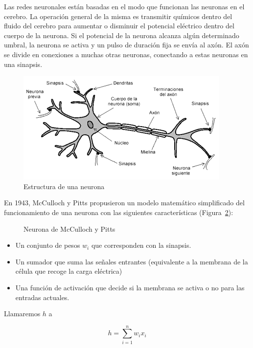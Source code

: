 Las redes neuronales están basadas en el modo que funcionan las neuronas en el cerebro. La operación general de la misma es transmitir químicos dentro del fluido del cerebro para aumentar o disminuir el potencial eléctrico dentro del cuerpo de la neurona. Si el potencial de la neurona alcanza algún determinado umbral, la neurona se activa y un pulso de duración fija se envía al axón. El axón se divide en conexiones a muchas otras neuronas, conectando a estas neuronas en una sinapsis.\\

\begin{figure}[tbph!]
\centering
\includegraphics[width=0.7\linewidth]{imagenes/neurona.png}
\caption{Estructura de una neurona}
\label{fig:neurona}
\end{figure}

En 1943, McCulloch y Pitts propusieron un modelo matemático simplificado del funcionamiento de una neurona con las siguientes características (Figura~\ref{fig:mccullochpitts}):

\begin{figure}[htbp!]

\centering
\neuronaMcCullochPitts
\caption{Neurona de McCulloch y Pitts}
\label{fig:mccullochpitts}
\end{figure}

\begin{itemize}
	\item Un conjunto de pesos $w_i$ que corresponden con la sinapsis.
	\item Un sumador que suma las señales entrantes (equivalente a la membrana de la célula que recoge la carga eléctrica)
	\item Una función de activación que decide si la membrana se activa o no para las entradas actuales. 
\end{itemize} 

Llamaremos $h$ a

\begin{equation}
h = \sum_{i=1}^{n} w_i x_i
\end{equation}

